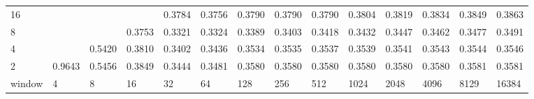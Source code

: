 \begin{table}[h]
{\begin{tabular}{lrrrrrrrrrrrrr}
			\multicolumn{1}{|l|}{16} &  &  &  & \cellcolor[HTML]{99E600}0.3784 & \cellcolor[HTML]{99E600}0.3756 & \cellcolor[HTML]{99E600}0.3790 & \cellcolor[HTML]{99E600}0.3790 & \cellcolor[HTML]{99E600}0.3790 & \cellcolor[HTML]{99E600}0.3804 & \cellcolor[HTML]{99E600}0.3819 & \cellcolor[HTML]{99E600}0.3834 & \cellcolor[HTML]{99E600}0.3849 & \cellcolor[HTML]{99E600}0.3863 \\ \cline{1-1}
			\multicolumn{1}{|l|}{8} &  &  & \cellcolor[HTML]{99E600}0.3753 & \cellcolor[HTML]{99E600}0.3321 & \cellcolor[HTML]{99E600}0.3324 & \cellcolor[HTML]{99E600}0.3389 & \cellcolor[HTML]{99E600}0.3403 & \cellcolor[HTML]{99E600}0.3418 & \cellcolor[HTML]{99E600}0.3432 & \cellcolor[HTML]{99E600}0.3447 & \cellcolor[HTML]{99E600}0.3462 & \cellcolor[HTML]{99E600}0.3477 & \cellcolor[HTML]{99E600}0.3491 \\ \cline{1-1}
			\multicolumn{1}{|l|}{4} &  & \cellcolor[HTML]{E69900}0.5420 & \cellcolor[HTML]{99E600}0.3810 & \cellcolor[HTML]{99E600}0.3402 & \cellcolor[HTML]{99E600}0.3436 & \cellcolor[HTML]{99E600}0.3534 & \cellcolor[HTML]{99E600}0.3535 & \cellcolor[HTML]{99E600}0.3537 & \cellcolor[HTML]{99E600}0.3539 & \cellcolor[HTML]{99E600}0.3541 & \cellcolor[HTML]{99E600}0.3543 & \cellcolor[HTML]{99E600}0.3544 & \cellcolor[HTML]{99E600}0.3546 \\ \cline{1-1}
			\multicolumn{1}{|l|}{2} & \cellcolor[HTML]{4C00E6}0.9643 & \cellcolor[HTML]{E69900}0.5456 & \cellcolor[HTML]{99E600}0.3849 & \cellcolor[HTML]{99E600}0.3444 & \cellcolor[HTML]{99E600}0.3481 & \cellcolor[HTML]{99E600}0.3580 & \cellcolor[HTML]{99E600}0.3580 & \cellcolor[HTML]{99E600}0.3580 & \cellcolor[HTML]{99E600}0.3580 & \cellcolor[HTML]{99E600}0.3580 & \cellcolor[HTML]{99E600}0.3580 & \cellcolor[HTML]{99E600}0.3581 & \cellcolor[HTML]{99E600}0.3581 \\ \cline{1-1}
			\multicolumn{1}{l|}{window} & \multicolumn{1}{l|}{4} & \multicolumn{1}{l|}{8} & \multicolumn{1}{l|}{16} & \multicolumn{1}{l|}{32} & \multicolumn{1}{l|}{64} & \multicolumn{1}{l|}{128} & \multicolumn{1}{l|}{256} & \multicolumn{1}{l|}{512} & \multicolumn{1}{l|}{1024} & \multicolumn{1}{l|}{2048} & \multicolumn{1}{l|}{4096} & \multicolumn{1}{l|}{8129} & \multicolumn{1}{l|}{16384} \\ \cline{2-14}
		\end{tabular}
	}
\end{table}




